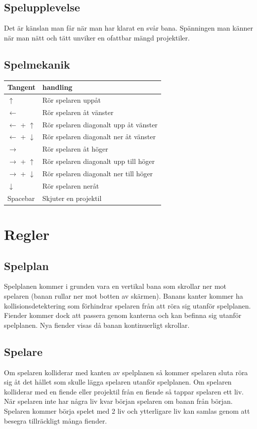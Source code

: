 \documentclass{TDP005mall}
\begin{document}
\subsection{Spelupplevelse}
Det är känslan man får när man har klarat en svår bana.
Spänningen man känner när man nätt och tätt unviker en ofattbar mängd projektiler.

\subsection{Spelmekanik}
\begin{table}[h]
\begin{tabularx}{\linewidth}{|l|X|}
\hline
  Tangent & handling \\\hline
  $\uparrow$ & Rör spelaren uppåt \\\hline
  $\leftarrow$ & Rör spelaren åt vänster \\\hline
  $\leftarrow$ + $\uparrow$ & Rör spelaren diagonalt upp åt vänster \\\hline
  $\leftarrow$ + $\downarrow$ & Rör spelaren diagonalt ner åt vänster \\\hline
  $\rightarrow$ & Rör spelaren åt höger \\\hline
  $\rightarrow$ + $\uparrow$ & Rör spelaren diagonalt upp till höger \\\hline
  $\rightarrow$ + $\downarrow$ & Rör spelaren diagonalt ner till höger \\\hline
  $\downarrow$ & Rör spelaren neråt \\\hline
  Spacebar & Skjuter en projektil \\\hline  
\end{tabularx}
\end{table}
\section{Regler}
\subsection{Spelplan}

Spelplanen kommer i grunden vara en vertikal bana som skrollar ner mot spelaren (banan rullar ner mot botten av skärmen).
Banans kanter kommer ha kollisionsdetektering som förhindrar spelaren från att röra sig utanför spelplanen.
Fiender kommer dock att passera genom kanterna och kan befinna sig utanför spelplanen. Nya fiender visas då banan kontinuerligt skrollar.

\subsection{Spelare}
Om spelaren kolliderar med kanten av spelplanen så kommer spelaren sluta röra sig åt det hållet som skulle lägga spelaren utanför spelplanen. 
Om spelaren kolliderar med en fiende eller projektil från en fiende så tappar spelaren ett liv.
När spelaren inte har några liv kvar början spelaren om banan från början.
Spelaren kommer börja spelet med 2 liv och ytterligare liv kan samlas genom att besegra tillräckligt många fiender.
\end{document}
